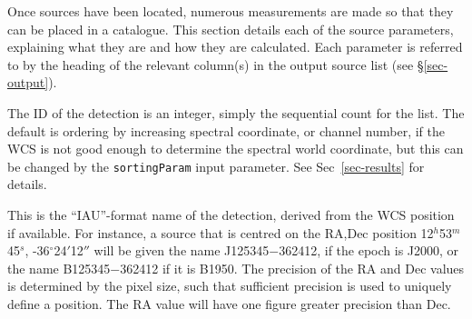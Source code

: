 %
%
%
%
\label{sec-sourceparam}

Once sources have been located, numerous measurements are made so that
they can be placed in a catalogue. This section details each of the
source parameters, explaining what they are and how they are
calculated. Each parameter is referred to by the heading of the
relevant column(s) in the output source list (see
\S\ref{sec-output}).

\label{sec-objectID}

The ID  of the detection is an integer, simply the sequential count for the
list. The default is ordering by increasing spectral coordinate, or channel
number, if the WCS is not good enough to determine the spectral world
coordinate, but this can be changed by the \texttt{sortingParam} input
parameter. See Sec~\ref{sec-results} for details.


This is the ``IAU''-format name of the detection, derived from the WCS
position if available.  For instance, a source that is centred on the
RA,Dec position 12$^h$53$^m$45$^s$, -36$^\circ$24$'$12$''$ will be
given the name J125345$-$362412, if the epoch is J2000, or the name
B125345$-$362412 if it is B1950. The precision of the RA and Dec
values is determined by the pixel size, such that sufficient precision
is used to uniquely define a position. The RA value will have one
figure greater precision than Dec.

